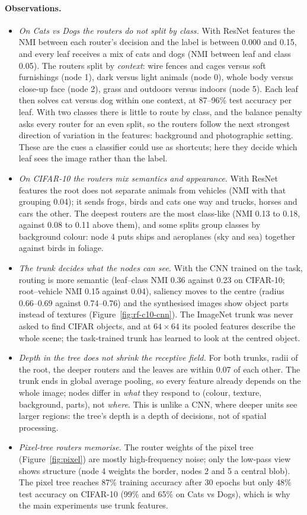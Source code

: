 \paragraph{Observations.}
\begin{itemize}
\item \emph{On Cats vs Dogs the routers do not split by class.} With ResNet features the NMI between each router's decision and the label is between 0.000 and 0.15, and every leaf receives a mix of cats and dogs (NMI between leaf and class 0.05). The routers split by \emph{context}: wire fences and cages versus soft furnishings (node 1), dark versus light animals (node 0), whole body versus close-up face (node 2), grass and outdoors versus indoors (node 5). Each leaf then solves cat versus dog within one context, at 87--96\% test accuracy per leaf. With two classes there is little to route by class, and the balance penalty asks every router for an even split, so the routers follow the next strongest direction of variation in the features: background and photographic setting. These are the cues a classifier could use as shortcuts; here they decide which leaf sees the image rather than the label.
\item \emph{On CIFAR-10 the routers mix semantics and appearance.} With ResNet features the root does not separate animals from vehicles (NMI with that grouping 0.04); it sends frogs, birds and cats one way and trucks, horses and cars the other. The deepest routers are the most class-like (NMI 0.13 to 0.18, against 0.08 to 0.11 above them), and some splits group classes by background colour: node 4 puts ships and aeroplanes (sky and sea) together against birds in foliage.
\item \emph{The trunk decides what the nodes can see.} With the CNN trained on the task, routing is more semantic (leaf--class NMI 0.36 against 0.23 on CIFAR-10; root--vehicle NMI 0.15 against 0.04), saliency moves to the centre (radius 0.66--0.69 against 0.74--0.76) and the synthesised images show object parts instead of textures (Figure~\ref{fig:rf-c10-cnn}). The ImageNet trunk was never asked to find CIFAR objects, and at $64\times64$ its pooled features describe the whole scene; the task-trained trunk has learned to look at the centred object.
\item \emph{Depth in the tree does not shrink the receptive field.} For both trunks, radii of the root, the deeper routers and the leaves are within 0.07 of each other. The trunk ends in global average pooling, so every feature already depends on the whole image; nodes differ in \emph{what} they respond to (colour, texture, background, parts), not \emph{where}. This is unlike a CNN, where deeper units see larger regions: the tree's depth is a depth of decisions, not of spatial processing.
\item \emph{Pixel-tree routers memorise.} The router weights of the pixel tree (Figure~\ref{fig:pixel}) are mostly high-frequency noise; only the low-pass view shows structure (node 4 weights the border, nodes 2 and 5 a central blob). The pixel tree reaches 87\% training accuracy after 30 epochs but only 48\% test accuracy on CIFAR-10 (99\% and 65\% on Cats vs Dogs), which is why the main experiments use trunk features.
\end{itemize}

